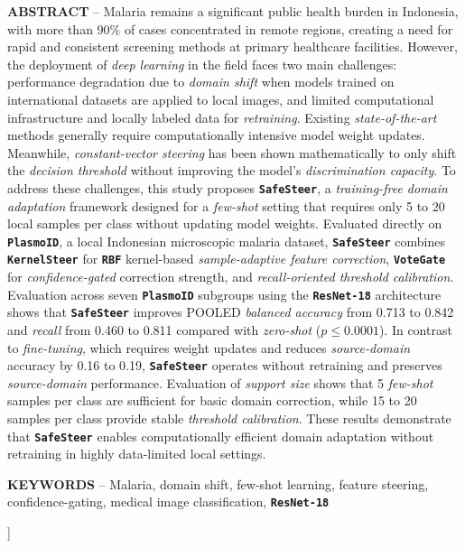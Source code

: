 \documentclass[conference]{IEEEtran}
\newcommand{\nama}[1]{\textbf{\texttt{#1}}}
\begin{document}
{\vspace{0.8em}
\noindent \textbf{ABSTRACT} -- Malaria remains a significant public health burden in Indonesia, with more than 90\% of cases concentrated in remote regions, creating a need for rapid and consistent screening methods at primary healthcare facilities. However, the deployment of \textit{deep learning} in the field faces two main challenges: performance degradation due to \textit{domain shift} when models trained on international datasets are applied to local images, and limited computational infrastructure and locally labeled data for \textit{retraining}. Existing \textit{state-of-the-art} methods generally require computationally intensive model weight updates. Meanwhile, \textit{constant-vector steering} has been shown mathematically to only shift the \textit{decision threshold} without improving the model's \textit{discrimination capacity}. To address these challenges, this study proposes \nama{SafeSteer}, a \textit{training-free domain adaptation} framework designed for a \textit{few-shot} setting that requires only 5 to 20 local samples per class without updating model weights. Evaluated directly on \nama{PlasmoID}, a local Indonesian microscopic malaria dataset, \nama{SafeSteer} combines \nama{KernelSteer} for \nama{RBF} kernel-based \textit{sample-adaptive feature correction}, \nama{VoteGate} for \textit{confidence-gated} correction strength, and \textit{recall-oriented threshold calibration}. Evaluation across seven \nama{PlasmoID} subgroups using the \nama{ResNet-18} architecture shows that \nama{SafeSteer} improves POOLED \textit{balanced accuracy} from 0.713 to 0.842 and \textit{recall} from 0.460 to 0.811 compared with \textit{zero-shot} ($p \leq 0.0001$). In contrast to \textit{fine-tuning}, which requires weight updates and reduces \textit{source-domain} accuracy by 0.16 to 0.19, \nama{SafeSteer} operates without retraining and preserves \textit{source-domain} performance. Evaluation of \textit{support size} shows that 5 \textit{few-shot} samples per class are sufficient for basic domain correction, while 15 to 20 samples per class provide stable \textit{threshold calibration}. These results demonstrate that \nama{SafeSteer} enables computationally efficient domain adaptation without retraining in highly data-limited local settings.
\vspace{0.8em}

\noindent \textbf{KEYWORDS} -- Malaria, domain shift, few-shot learning, feature steering, confidence-gating, medical image classification, \nama{ResNet-18}
}
\vspace{2em}
]
\end{document}

